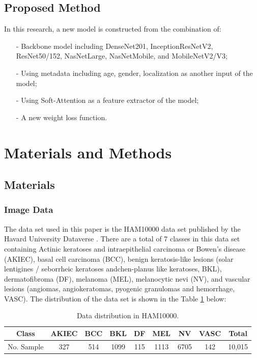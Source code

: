 \documentclass[sensors,article,accept,pdftex,moreauthors]{Definitions/mdpi}
\begin{document}
	\subsection{Proposed Method}
	In this research, a new model is constructed from the combination of:
	
	\begin{itemize}
	\item[-] Backbone model including DenseNet201, InceptionResNetV2, ResNet50/152, NasNetLarge, NasNetMobile, and MobileNetV2/V3;
	\item[-] Using metadata including age, gender, localization as another input of the model;
	\item[-] Using Soft-Attention as a feature extractor of the model;
	\item[-] A new weight loss function.
	\end{itemize}
	\section{Materials and Methods}
	\subsection{Materials}
	\subsubsection{Image Data}
	The data set used in this paper is the HAM10000 data set published by the Havard University Dataverse \cite{10417}. There are a total of 7 classes in this data set containing Actinic keratoses and intraepithelial carcinoma or Bowen's disease (AKIEC), basal cell carcinoma (BCC),  benign keratosis-like lesions (solar lentigines / seborrheic keratoses andchen-planus like keratoses, BKL), dermatofibroma (DF), melanoma (MEL), melanocytic nevi (NV), and vascular lesions (angiomas, angiokeratomas, pyogenic granulomas and hemorrhage, VASC). The distribution of the data set is shown in the Table \ref{table:data-distribution} below:
	
	\begin{table}[H]
		\caption{Data distribution in HAM10000.}
		\label{table:data-distribution}
		\setlength{\tabcolsep}{3.05mm}\begin{tabular}{c c c c c c c c c} 
\toprule
\textbf{Class} & \textbf{AKIEC} & \textbf{BCC} & \textbf{BKL} & \textbf{DF} & \textbf{MEL} & \textbf{NV} & \textbf{VASC} & \textbf{Total} \\ 
\midrule
No. Sample & 327 & 514 & 1099 & 115 & 1113 & 6705 & 142 & 10,015 \\
\bottomrule
		\end{tabular}
	\end{table}
	
\end{document}
